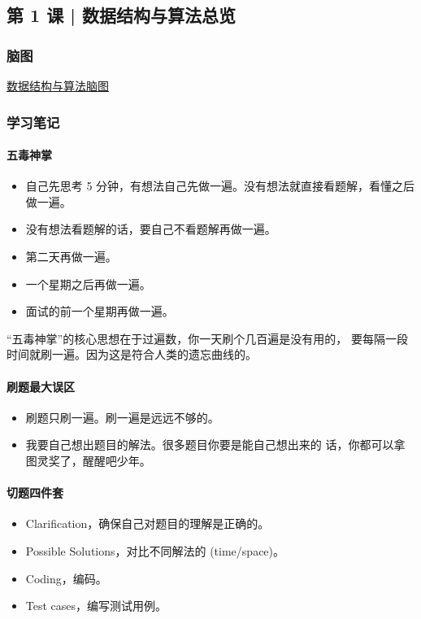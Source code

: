 \subsection{第 1 课 | 数据结构与算法总览}

\subsubsection{脑图}

\href{https://github.com/MDGSF/algorithm005-class02/blob/master/Week_00/G20190343020039/%E7%AE%97%E6%B3%95%E8%84%91%E5%9B%BE.jpeg}{数据结构与算法脑图}

\subsubsection{学习笔记}

\paragraph{五毒神掌}

\begin{itemize}
  \item 自己先思考 5 分钟，有想法自己先做一遍。没有想法就直接看题解，看懂之后做一遍。
  \item 没有想法看题解的话，要自己不看题解再做一遍。
  \item 第二天再做一遍。
  \item 一个星期之后再做一遍。
  \item 面试的前一个星期再做一遍。
\end{itemize}

``五毒神掌''的核心思想在于过遍数，你一天刷个几百遍是没有用的，
要每隔一段时间就刷一遍。因为这是符合人类的遗忘曲线的。

\paragraph{刷题最大误区}

\begin{itemize}
  \item 刷题只刷一遍。刷一遍是远远不够的。
  \item 我要自己想出题目的解法。很多题目你要是能自己想出来的
    话，你都可以拿图灵奖了，醒醒吧少年。
\end{itemize}

\paragraph{切题四件套}

\begin{itemize}
  \item Clarification，确保自己对题目的理解是正确的。
  \item Possible Solutions，对比不同解法的 (time/space)。
  \item Coding，编码。
  \item Test cases，编写测试用例。
\end{itemize}
